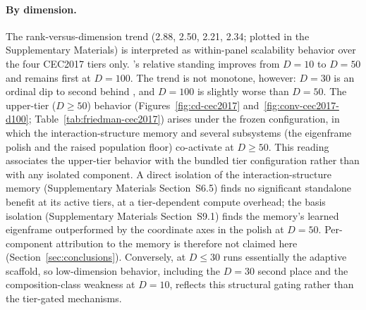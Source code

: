 \paragraph{By dimension.}
The rank-versus-dimension trend (2.88,
2.50, 2.21, 2.34; plotted in the Supplementary Materials) is interpreted as
within-panel scalability behavior over the four CEC2017 tiers only.
\dtgsk{}'s relative standing
improves from $D = 10$ to $D = 50$ and remains first at $D = 100$.
The trend is not monotone, however: $D = 30$ is an ordinal dip to
second behind \egsk{}, and $D = 100$ is slightly worse than $D = 50$.
The upper-tier ($D \geq 50$) behavior (Figures~\ref{fig:cd-cec2017}
and~\ref{fig:conv-cec2017-d100}; Table~\ref{tab:friedman-cec2017}) arises under
the frozen configuration, in which the interaction-structure memory
and several subsystems (the eigenframe polish and the raised population
floor) co-activate at $D \geq 50$.
This reading associates the upper-tier behavior with the bundled
tier configuration rather than with any isolated component. A direct
isolation of the interaction-structure memory (Supplementary Materials
Section~S6.5) finds no significant standalone benefit at its active
tiers, at a tier-dependent compute overhead; the basis isolation
(Supplementary Materials Section~S9.1) finds the
memory's learned eigenframe outperformed by the coordinate axes in the polish
at $D = 50$. Per-component attribution to
the memory is therefore not claimed here (Section~\ref{sec:conclusions}).
Conversely, at $D \leq 30$ \dtgsk{} runs essentially the
adaptive scaffold, so low-dimension behavior, including the
$D = 30$ second place and the composition-class weakness at
$D = 10$, reflects this structural gating rather than the tier-gated
mechanisms.

